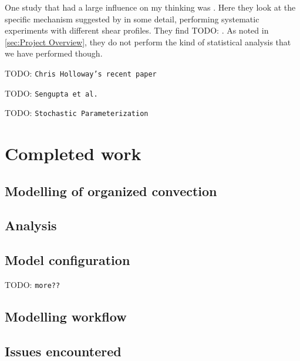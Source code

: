 \documentclass[11pt,a4paper]{article}
\newcommand{\todo}{TODO: \texttt}
\begin{document}
One study that had a large influence on my thinking was \cite{RE2001}. Here they look at the specific mechanism suggested by \cite{RKW1988} in some detail, performing systematic experiments with different shear profiles. They find \todo{}. As noted in \ref{sec:Project Overview}, they do not perform the kind of statistical analysis that we have performed though.

\todo{Chris Holloway's recent paper}

\todo{Sengupta et al.}

\todo{Stochastic Parameterization}

\section{Completed work}

\subsection{Modelling of organized convection}
\label{sec:modelling_org}


\subsection{Analysis}
\label{sec:analysis}


\subsection{Model configuration}
\label{sec:modelling_config}

\todo{more??}

\subsection{Modelling workflow}
\label{sec:modelling_workflow}




\subsection{Issues encountered}
\label{sec:issues}
\end{document}
